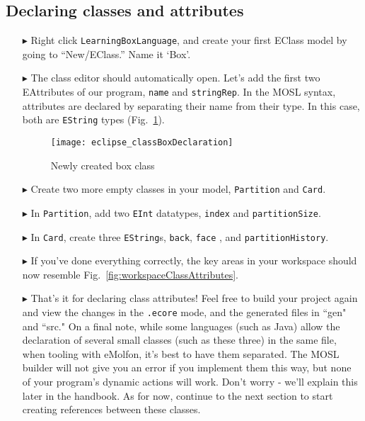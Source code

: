 \newpage
\subsection{Declaring classes and attributes}
\texHeader
\hypertarget{static:classes tex}{}

\begin{itemize}

\item[$\blacktriangleright$] Right click \texttt{LearningBoxLanguage}, and create your first EClass model by going to ``New/EClass.'' Name it `Box'.

\item[$\blacktriangleright$] The class editor should automatically open. Let's add the first two EAttributes of our program, \texttt{name} and
\texttt{stringRep}. In the MOSL syntax, attributes are declared by separating their name from their type. In this case, both are \texttt{EString} types
(Fig.~\ref{fig:boxDeclaration}).

\vspace{0.5cm}

\begin{figure}[htbp]
	\centering
  \texttt{[image: eclipse\_classBoxDeclaration]}
	\caption{Newly created box class}
	\label{fig:boxDeclaration}
\end{figure} 

\vspace{0.5cm}

\item[$\blacktriangleright$] Create two more empty classes in your model, \texttt{Partition} and \texttt{Card}.

\item[$\blacktriangleright$] In \texttt{Partition}, add two \texttt{EInt} datatypes, \texttt{index} and \texttt{partitionSize}.

\item[$\blacktriangleright$] In \texttt{Card}, create three \texttt{EString}s, \texttt{back}, \texttt{face} , and \texttt{partitionHistory}.

\item[$\blacktriangleright$] If you've done everything correctly, the key areas in your workspace should now resemble Fig.~\ref{fig:workspaceClassAttributes}.

\item[$\blacktriangleright$] That's it for declaring class attributes! Feel free to build your project again and view the changes in the \texttt{.ecore}
mode, and the generated files in ``gen" and ``src." On a final note, while some languages (such as Java) allow the declaration of several small classes (such as
these three) in the same file, when tooling with eMolfon, it's best to have them separated. The MOSL builder will not give you an error if you implement them this way, but none of your program's dynamic actions will work. Don't worry - we'll explain this later in the handbook. As for now, continue to the next section to start creating references between these classes.


\end{itemize}
